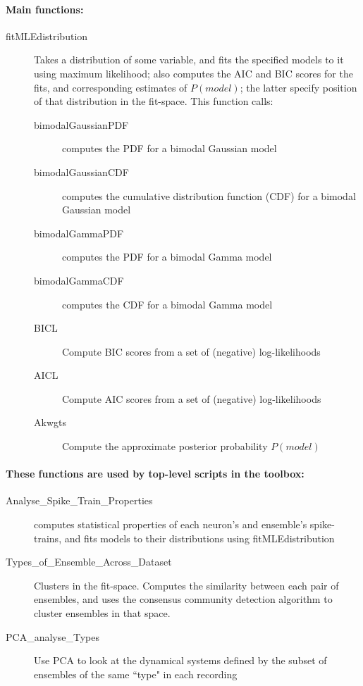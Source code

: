 \documentclass[11pt,a4paper]{article}
\begin{document}
\paragraph{Main functions:}
\begin{description}
\item[fitMLEdistribution] Takes a distribution of some variable, and fits the specified models to it using maximum likelihood; also computes the AIC and BIC scores for the fits, and corresponding estimates of $P(model)$; the latter specify position of that distribution in the fit-space. This function calls:
    \begin{description}
        \item[bimodalGaussianPDF] computes the PDF for a bimodal Gaussian model
        \item[bimodalGaussianCDF] computes the cumulative distribution function (CDF) for a bimodal Gaussian model
        \item[bimodalGammaPDF] computes the PDF for a bimodal Gamma model
        \item[bimodalGammaCDF] computes the CDF for a bimodal Gamma model
        \item[BICL] Compute BIC scores from a set of (negative) log-likelihoods
        \item[AICL] Compute AIC scores from a set of (negative) log-likelihoods
        \item[Akwgts] Compute the approximate posterior probability $P(model)$
    \end{description}
\end{description}

\paragraph{These functions are used by top-level scripts in the toolbox:}
\begin{description}
\item[Analyse\_Spike\_Train\_Properties] computes statistical properties of each neuron's and ensemble's spike-trains, and fits models to their distributions using fitMLEdistribution
\item[Types\_of\_Ensemble\_Across\_Dataset] Clusters in the fit-space. Computes the similarity between each pair of ensembles, and uses the consensus community detection algorithm to cluster ensembles in that space.
\item[PCA\_analyse\_Types] Use PCA to look at the dynamical systems defined by the subset of ensembles of the same ``type" in each recording
\end{description}

\end{document}
